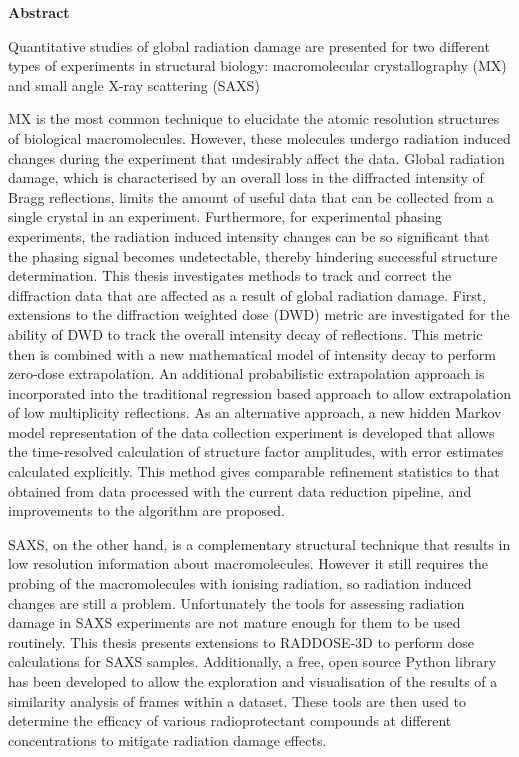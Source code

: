 \newenvironment{abstract}%
{\cleardoublepage\thispagestyle{empty}\vfill\begin{center}%
\bfseries Abstract\end{center}}%
{\vfill}
\begin{abstract}
\small
\singlespacing
Quantitative studies of global radiation damage are presented for two different types of experiments in structural biology: macromolecular crystallography (MX) and small angle X-ray scattering (SAXS)

MX is the most common technique to elucidate the atomic resolution structures of biological macromolecules.
However, these molecules undergo radiation induced changes during the experiment that undesirably affect the data.
Global radiation damage, which is characterised by an overall loss in the diffracted intensity of Bragg reflections, limits the amount of useful data that can be collected from a single crystal in an experiment.
Furthermore, for experimental phasing experiments, the radiation induced intensity changes can be so significant that the phasing signal becomes undetectable, thereby hindering successful structure determination.
This thesis investigates methods to track and correct the diffraction data that are affected as a result of global radiation damage.
First, extensions to the diffraction weighted dose (DWD) metric are investigated for the ability of DWD to track the overall intensity decay of reflections.
This metric then is combined with a new mathematical model of intensity decay to perform zero-dose extrapolation.
An additional probabilistic extrapolation approach is incorporated into the traditional regression based approach to allow extrapolation of low multiplicity reflections.
As an alternative approach, a new hidden Markov model representation of the data collection experiment is developed that allows the time-resolved calculation of structure factor amplitudes, with error estimates calculated explicitly.
This method gives comparable refinement statistics to that obtained from data processed with the current data reduction pipeline, and improvements to the algorithm are proposed.

SAXS, on the other hand, is a complementary structural technique that results in low resolution information about macromolecules.
However it still requires the probing of the macromolecules with ionising radiation, so radiation induced changes are still a problem.
Unfortunately the tools for assessing radiation damage in SAXS experiments are not mature enough for them to be used routinely.
This thesis presents extensions to RADDOSE-3D to perform dose calculations for SAXS samples.
Additionally, a free, open source Python library has been developed to allow the exploration and visualisation of the results of a similarity analysis of frames within a dataset.
These tools are then used to determine the efficacy of various radioprotectant compounds at different concentrations to mitigate radiation damage effects.
\end{abstract}
